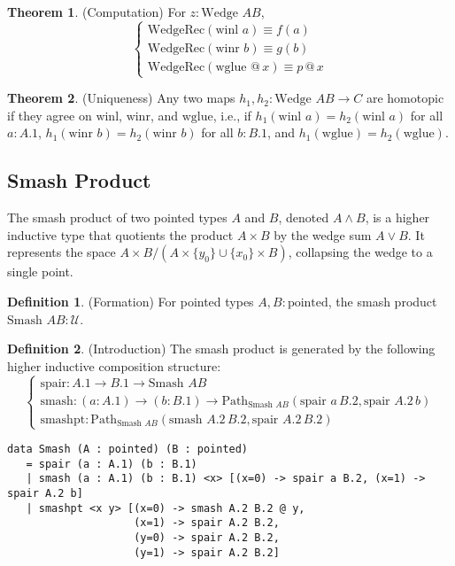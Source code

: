 \documentclass{article}
\theoremstyle{definition}
\newtheorem{theorem}{Theorem}
\newtheorem{definition}{Definition}
\begin{document}
\begin{theorem} (Computation)
For $z : \text{Wedge } A B$,
\[
\begin{cases}
\text{WedgeRec}(\text{winl } a) \equiv f(a) \\
\text{WedgeRec}(\text{winr } b) \equiv g(b) \\
\text{WedgeRec}(\text{wglue } @ \, x) \equiv p \, @ \, x
\end{cases}
\]
\end{theorem}

\begin{theorem} (Uniqueness)
Any two maps $h_1, h_2 : \text{Wedge } A B \to C$ are homotopic if
they agree on $\text{winl}$, $\text{winr}$, and $\text{wglue}$,
i.e., if $h_1(\text{winl } a) = h_2(\text{winl } a)$ for
all $a : A.1$, $h_1(\text{winr } b) = h_2(\text{winr } b)$ for
all $b : B.1$, and $h_1(\text{wglue}) = h_2(\text{wglue})$.
\end{theorem}

\newpage
\subsection{Smash Product}
The smash product of two pointed types $A$ and $B$, denoted $A \wedge B$,
is a higher inductive type that quotients the product $A \times B$ by the
wedge sum $A \vee B$. It represents the space $A \times B / (A \times \{ y_0 \} \cup \{ x_0 \} \times B)$,
collapsing the wedge to a single point.

\begin{definition} (Formation)
For pointed types $A, B : \text{pointed}$, the smash product $\text{Smash } A B : \mathcal{U}$.
\end{definition}

\begin{definition} (Introduction)
The smash product is generated by the following higher inductive composition structure:
\[
\begin{cases}
\text{spair} : A.1 \to B.1 \to \text{Smash } A B \\
\text{smash} : (a : A.1) \to (b : B.1) \to \text{Path}_{\text{Smash } A B} (\text{spair } a \, B.2, \text{spair } A.2 \, b) \\
\text{smashpt} : \text{Path}_{\text{Smash } A B} (\text{smash } A.2 \, B.2, \text{spair } A.2 \, B.2)
\end{cases}
\]
\begin{lstlisting}
data Smash (A : pointed) (B : pointed)
   = spair (a : A.1) (b : B.1)
   | smash (a : A.1) (b : B.1) <x> [(x=0) -> spair a B.2, (x=1) -> spair A.2 b]
   | smashpt <x y> [(x=0) -> smash A.2 B.2 @ y,
                    (x=1) -> spair A.2 B.2,
                    (y=0) -> spair A.2 B.2,
                    (y=1) -> spair A.2 B.2]
\end{lstlisting}
\end{definition}
\end{document}
